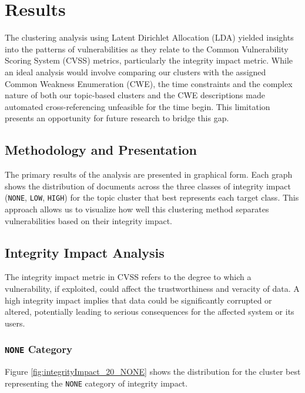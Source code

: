 \documentclass[12pt]{article}
\begin{document}
\section{Results}

The clustering analysis using Latent Dirichlet Allocation (LDA) yielded insights into the patterns
of vulnerabilities as they relate to the Common Vulnerability Scoring System (CVSS) metrics,
particularly the integrity impact metric. While an ideal analysis would involve comparing our
clusters with the assigned Common Weakness Enumeration (CWE), the time constraints and the complex
nature of both our topic-based clusters and the CWE descriptions made automated cross-referencing
unfeasible for the time begin. This limitation presents an opportunity for future research to bridge this gap.

\subsection{Methodology and Presentation}

The primary results of the analysis are presented in graphical form. Each graph shows the
distribution of documents across the three classes of integrity impact (\texttt{NONE}, \texttt{LOW},
\texttt{HIGH}) for the topic cluster that best represents each target class. This approach allows us
to visualize how well this clustering method separates vulnerabilities based on their integrity impact.

\subsection{Integrity Impact Analysis}

The integrity impact metric in CVSS refers to the degree to which a vulnerability, if exploited, could affect the trustworthiness and veracity of data. A high integrity impact implies that data could be significantly corrupted or altered, potentially leading to serious consequences for the affected system or its users.

\subsubsection{\texttt{NONE} Category}
Figure \ref{fig:integrityImpact_20_NONE} shows the distribution for the cluster best representing the \texttt{NONE} category of integrity impact.
\end{document}
